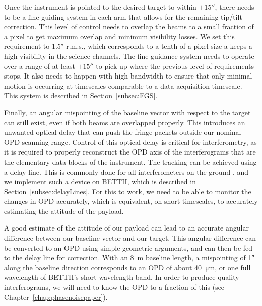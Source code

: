 Once the instrument is pointed to the desired target to within $\pm\ang{;;15}$, there needs to be a fine guiding system in each arm that allows for the remaining tip/tilt correction. This level of control needs to overlap the beams to a small fraction of a pixel to get maximum overlap and minimum visibility losses. We set this requirement to \ang{;;1.5} r.m.s., which corresponds to a tenth of a pixel size a keeps a high visibility in the science channels. The fine guidance system needs to operate over a range of at least $\pm\ang{;;15}$ to pick up where the previous level of requirements stops. It also needs to happen with high bandwidth to ensure that only minimal motion is occurring at timescales comparable to a data acquisition timescale. This system is described in Section~\ref{subsec:FGS}.

Finally, an angular mispointing of the baseline vector with respect to the target can still exist, even if both beams are overlapped properly. This introduces an unwanted optical delay that can push the fringe packets outside our nominal OPD scanning range. Control of this optical delay is critical for interferometry, as it is required to properly reconstruct the OPD axis of the interferograms that are the elementary data blocks of the instrument. The \OPD tracking can be achieved using a delay line. This is commonly done for all interferometers on the ground \citep[e.g.][]{Blind:2011ji}, and we implement such a device on BETTII, which is described in Section~\ref{subsec:delayLines}. For this to work, we need to be able to monitor the changes in OPD accurately, which is equivalent, on short timescales, to accurately estimating the attitude of the payload.


%	
%

A good estimate of the attitude of our payload can lead to an accurate angular difference between our baseline vector and our target. This angular difference can be converted to an OPD using simple geometric arguments, and can then be fed to the delay line for correction. With an 8~m baseline length, a mispointing of \ang{;;1} along the baseline direction corresponds to an OPD of about \SI{40}{\um}, or one full wavelength of BETTII's short-wavelength band. In order to produce quality interferograms, we will need to know the OPD to a fraction of this (see Chapter~\ref{chap:phasenoisepaper}). 


